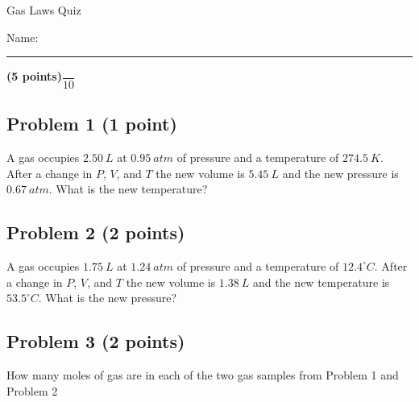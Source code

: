 \documentclass[12pt, letterpaper]{memoir}
\begin{document}
	\begin{center}
		{\large Gas Laws Quiz}
	\end{center}
	{\large Name: \rule[-1mm]{4in}{.1pt} {\bfseries (5 points)}\hspace{4em}$\dfrac{~}{10}$} 
	
	\subsection*{Problem 1 (1 point)}
	A gas occupies $2.50~L$ at $0.95~atm$ of pressure and a temperature of $274.5~K$. After a change in $P$, $V$, and $T$ the new volume is $5.45~L$ and the new pressure is $0.67~atm$. What is the new temperature?
	
	\vspace{10em}
	\subsection*{Problem 2 (2 points)}
	A gas occupies $1.75~L$ at $1.24~atm$ of pressure and a temperature of $12.4^\circ C$. After a change in $P$, $V$, and $T$ the new volume is $1.38~L$ and the new temperature is $53.5^\circ C$. What is the new pressure?
	
	\vspace{10em}
	\subsection*{Problem 3 (2 points)}
	How many moles of gas are in each of the two gas samples from Problem 1 and Problem 2 
\end{document}
